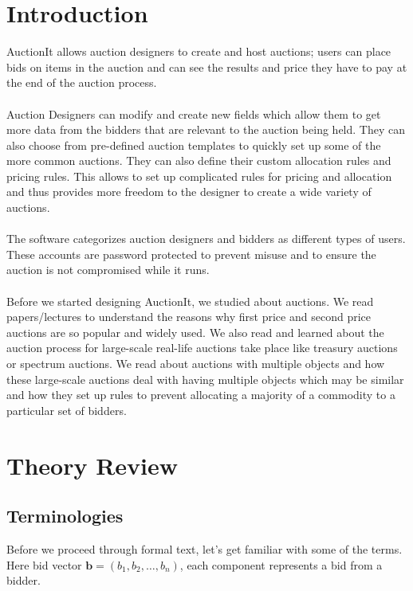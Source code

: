 \documentclass[a4paper]{article}
\begin{document}
\section*{Introduction}
AuctionIt allows auction designers to create and host auctions; users can place bids on items in the auction and can see the results and price they have to pay at the end of the auction process.
\\\\ Auction Designers can modify and create new fields which allow them to get more data from the bidders that are relevant to the auction being held. They can also choose from pre-defined auction templates to quickly set up some of the more common auctions. They can also define their custom allocation rules and pricing rules. This allows to set up complicated rules for pricing and allocation and thus provides more freedom to the designer to create a wide variety of auctions. 
\\\\
The software categorizes auction designers and bidders as different types of users. These accounts are password protected to prevent misuse and to ensure the auction is not compromised while it runs.
\\\\
Before we started designing AuctionIt, we studied about auctions. We read papers/lectures to understand the reasons why first price and second price auctions are so popular and widely used. We also read and learned about the auction process for large-scale real-life auctions take place like treasury auctions or spectrum auctions. We read about auctions with multiple objects and how these large-scale auctions deal with having multiple objects which may be similar and how they set up rules to prevent allocating a majority of a commodity to a particular set of bidders.



\pagebreak
\section*{Theory Review}
\subsection*{Terminologies}
Before we proceed through formal text, let's get familiar with some of the terms.
Here bid vector $\mathbf{b} = (b_1, b_2,\ldots,b_n)$, each component represents a bid from a bidder.
\end{document}
